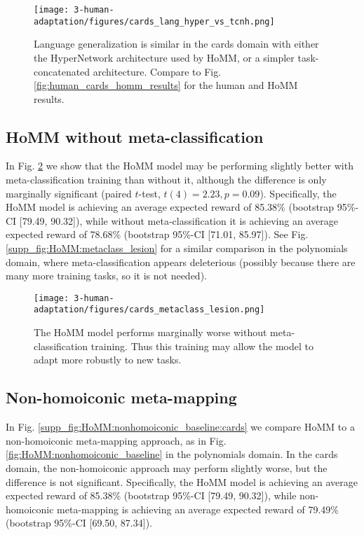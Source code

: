 \begin{figure}[H]
\centering
\texttt{[image: 3-human-adaptation/figures/cards\_lang\_hyper\_vs\_tcnh.png]}
\caption[Language generalization is similar in the cards domain with either the HyperNetwork architecture used by HoMM, or a simpler task-concatenated architecture.]{Language generalization is similar in the cards domain with either the HyperNetwork architecture used by HoMM, or a simpler task-concatenated architecture. Compare to Fig. \ref{fig:human_cards_homm_results} for the human and HoMM results.} \label{supp_fig:human:lang_tcnh}
\end{figure}



\subsection{HoMM without meta-classification}

In Fig. \ref{supp_fig:human:homm_metaclass_lesion} we show that the HoMM model may be performing slightly better with meta-classification training than without it, although the difference is only marginally significant (paired \(t\)-test, \(t(4) = 2.23, p = 0.09\)). Specifically, the HoMM model is achieving an average expected reward of 85.38\% (bootstrap 95\%-CI [79.49, 90.32]), while without meta-classification it is achieving an average expected reward of 78.68\% (bootstrap 95\%-CI [71.01, 85.97]). See Fig. \ref{supp_fig:HoMM:metaclass_lesion} for a similar comparison in the polynomials domain, where meta-classification appears deleterious (possibly because there are many more training tasks, so it is not needed). 

\begin{figure}[H]
\centering
\texttt{[image: 3-human-adaptation/figures/cards\_metaclass\_lesion.png]}
\caption[The HoMM model performs marginally worse without meta-classification training.]{The HoMM model performs marginally worse without meta-classification training. Thus this training may allow the model to adapt more robustly to new tasks.} \label{supp_fig:human:homm_metaclass_lesion}
\end{figure}

\subsection{Non-homoiconic meta-mapping}

In Fig. \ref{supp_fig:HoMM:nonhomoiconic_baseline:cards} we compare HoMM to a non-homoiconic meta-mapping approach, as in Fig. \ref{fig:HoMM:nonhomoiconic_baseline} in the polynomials domain. In the cards domain, the non-homoiconic approach may perform slightly worse, but the difference is not significant. Specifically, the HoMM model is achieving an average expected reward of 85.38\% (bootstrap 95\%-CI [79.49, 90.32]), while non-homoiconic meta-mapping is achieving an average expected reward of 79.49\% (bootstrap 95\%-CI [69.50, 87.34]). 


